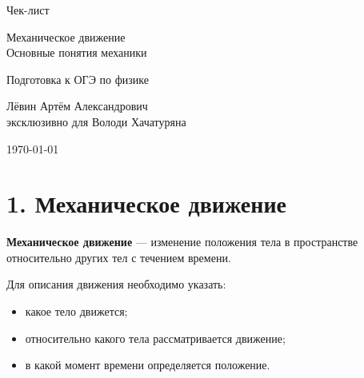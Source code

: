 \documentclass[a4paper,12pt]{article}
\begin{document}

\begin{titlepage}
\centering
\vspace*{2cm}

{\Huge\color{darkaccent} Чек-лист\par}
\vspace{0.7cm}

{\LARGE Механическое движение\\
Основные понятия механики\par}

\vspace{1.5cm}

{\large Подготовка к ОГЭ по физике\par}

\vspace{1cm}

{\large
Лёвин Артём Александрович\\
эксклюзивно для Володи Хачатуряна\par}

\vfill

{\large \today\par}

\vspace{1.5cm}


\end{titlepage}


\section*{1. Механическое движение}

\textbf{Механическое движение} --- изменение положения тела
в пространстве относительно других тел с течением времени.

Для описания движения необходимо указать:

\begin{itemize}
    \item какое тело движется;
    \item относительно какого тела рассматривается движение;
    \item в какой момент времени определяется положение.
\end{itemize}
\end{document}
